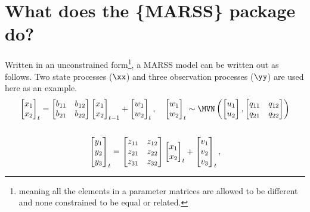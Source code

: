 \section{What does the \{MARSS\} package do?}
Written in an unconstrained form\footnote{meaning all the elements in a parameter matrices are allowed to be different and none constrained to be equal or related.}, a MARSS model can be written out as follows. Two state processes ($\xx$) and three observation processes ($\yy$) are used here as an example.
\begin{gather*}
\begin{bmatrix}x_1\\ x_2\end{bmatrix}_t
= \begin{bmatrix}b_{11}&b_{12}\\b_{21}&b_{22}\end{bmatrix}
\begin{bmatrix}x_1\\x_2\end{bmatrix}_{t-1}
+ \begin{bmatrix}w_1\\ w_2\end{bmatrix}_t,\quad 
\begin{bmatrix}w_1\\ w_2\end{bmatrix}_t \sim \MVN\begin{pmatrix}\begin{bmatrix}u_1\\u_2\end{bmatrix},\begin{bmatrix}q_{11}&q_{12}\\q_{21}&q_{22}\end{bmatrix} \end{pmatrix}  \\
\\
\begin{bmatrix}y_1\\ y_2\\ y_3\end{bmatrix}_t
= \begin{bmatrix}z_{11}&z_{12}\\ z_{21}&z_{22}\\ z_{31}&z_{32}\end{bmatrix}
\begin{bmatrix}x_1\\ x_2\end{bmatrix}_t
+ \begin{bmatrix}v_1\\ v_2\\ v_3\end{bmatrix}_t,

\end{gather*}
